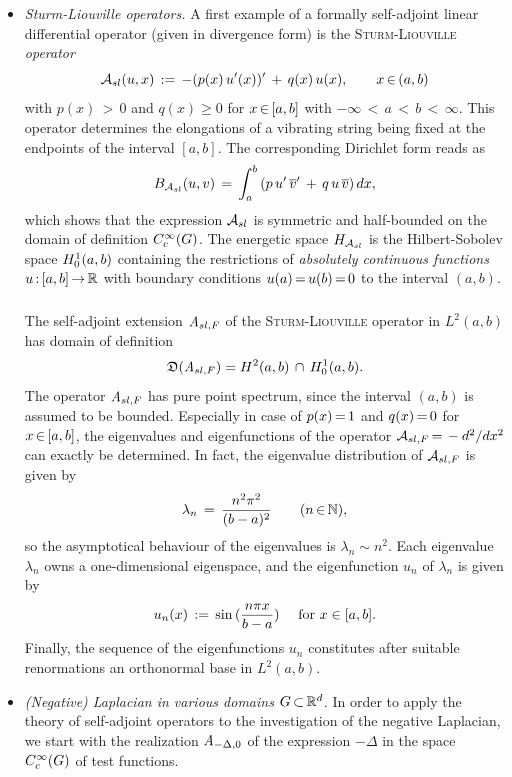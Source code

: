 \documentclass[11pt,twoside]{article}
\def\G{G}
\begin{document}
\begin{itemize}[leftmargin=9mm]
\item[(a)] \textit{Sturm-Liouville operators.}
A first example of a formally self-adjoint linear differential operator
(given in divergence form) is the \textsc{Sturm-Liouville} \textit{operator}
\[
{\mathcal{A}}_{sl}(u,x) \,:=\, -(p(x)\, u'(x))' \,+\, q(x)\, u(x),
\quad \quad x {\,\in\,} (a,b)
\]
with $p(x) {\,>\,} 0$ and $q(x) \geq 0$ for $x {\,\in\,} [a,b]$
with $-\infty {\,<\,} a {\,<\,} b {\,<\,} \infty$.
This operator determines the elongations of a vibrating string
being fixed at the endpoints of the interval $[a,b]$.
The corresponding Dirichlet form reads as
\[
B_{{\mathcal{A}}_{sl}}(u,v) \,=\,
\int_a^b \,
(p \, u'\, \overline{v}' \,+\, q \, u \, \overline{v}) \, dx,
\]
which shows that the expression ${\mathcal{A}}_{sl}$ is symmetric and half-bounded
on the domain of definition $\TF$.
The energetic space $H_{{\mathcal{A}}_{sl}}$ is the Hilbert-Sobolev space $H_0^{1}(a,b)$
containing the restrictions of 
\textit{absolutely continuous functions} $u{\,:\,} [a,b] {\,\to\,} {\mathbb{R}}$
with boundary conditions $u(a) {\,=\,} u(b) {\,=\,} 0$ to the interval $(a,b)$.

\subparagraph{}
The self-adjoint extension $\mathit{A}_{sl,F}$
of the \textsc{Sturm-Liouville} operator in $L^2(a,b)$ has domain of definition
\[
\mathfrak{D}(\mathit{A}_{sl,F}) = H^2(a,b) \, \cap \, H_0^{1}(a,b).
\]
The operator $\mathit{A}_{sl,F}$ has pure point spectrum,
since the interval $(a,b)$ is assumed to be bounded.
Especially in case of $p(x) {\,=\,} 1$ and $q(x) {\,=\,} 0$ for $x {\,\in\,} [a,b]$, 
the eigen\-values and eigen\-functions
of the operator ${\mathcal{A}}_{sl,F} {\,=\,} - {d^2} / {dx^2}$ can exactly be determined.
In fact,
the eigenvalue distribution of ${\mathcal{A}}_{sl,F}$ is given by
\[
\lambda_n \,=\, \frac{n^2 \pi^2}{(b-a)^2} \quad \quad (n {\,\in\,} {\mathbb{N}}),
\]
so the asymptotical behaviour of the eigen\-values is $\lambda_n \sim n^2$.
Each eigen\-value $\lambda_n$ owns a one-dimensional eigen\-space,
and the eigen\-function $u_n$ of $\lambda_n$ is given by
\[
u_n(x) \,:=\, \sin \, (\frac{n \pi x}{b-a}) \quad \mbox{ for } x \in [a,b].
\]
Finally,
the sequence of the eigen\-functions $u_n$
constitutes after suitable renormations an ortho\-normal base in $L^2(a,b)$.

\item[(b)] \textit{(Negative) Laplacian in various domains $\G \xsubset \Rd$.}
In order to apply the theory of self-adjoint operators
to the investigation of the negative Laplacian,
we start with the realization $\mathit{A}_{-\Delta,0}$ of the expression $-\Delta$
in the space $\TF$ of test functions.


\end{itemize}
\end{document}
